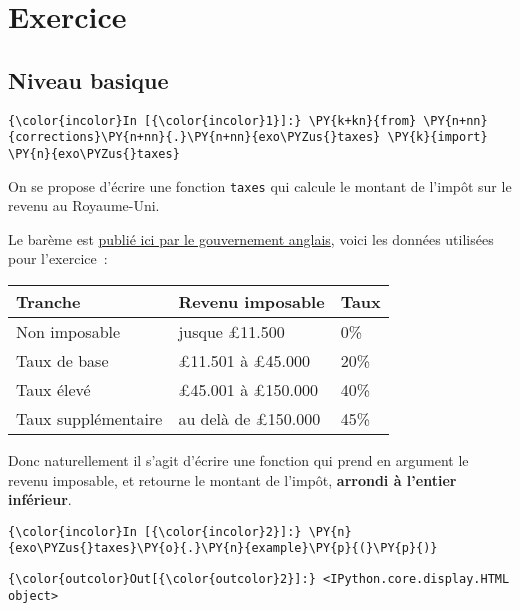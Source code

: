     
    
    
    

    

    \hypertarget{exercice}{%
\section{Exercice}\label{exercice}}

    \hypertarget{niveau-basique}{%
\subsection{Niveau basique}\label{niveau-basique}}

    \begin{Verbatim}[commandchars=\\\{\}]
{\color{incolor}In [{\color{incolor}1}]:} \PY{k+kn}{from} \PY{n+nn}{corrections}\PY{n+nn}{.}\PY{n+nn}{exo\PYZus{}taxes} \PY{k}{import} \PY{n}{exo\PYZus{}taxes}
\end{Verbatim}


    On se propose d'écrire une fonction \texttt{taxes} qui calcule le
montant de l'impôt sur le revenu au Royaume-Uni.

    Le barème est \href{https://www.gov.uk/income-tax-rates}{publié ici par
le gouvernement anglais}, voici les données utilisées pour l'exercice~:

    \begin{longtable}[]{@{}lll@{}}
\toprule
Tranche & Revenu imposable & Taux\tabularnewline
\midrule
\endhead
Non imposable & jusque £11.500 & 0\%\tabularnewline
Taux de base & £11.501 à £45.000 & 20\%\tabularnewline
Taux élevé & £45.001 à £150.000 & 40\%\tabularnewline
Taux supplémentaire & au delà de £150.000 & 45\%\tabularnewline
\bottomrule
\end{longtable}

    Donc naturellement il s'agit d'écrire une fonction qui prend en argument
le revenu imposable, et retourne le montant de l'impôt, \textbf{arrondi
à l'entier inférieur}.

    \begin{Verbatim}[commandchars=\\\{\}]
{\color{incolor}In [{\color{incolor}2}]:} \PY{n}{exo\PYZus{}taxes}\PY{o}{.}\PY{n}{example}\PY{p}{(}\PY{p}{)}
\end{Verbatim}


\begin{Verbatim}[commandchars=\\\{\}]
{\color{outcolor}Out[{\color{outcolor}2}]:} <IPython.core.display.HTML object>
\end{Verbatim}
            
